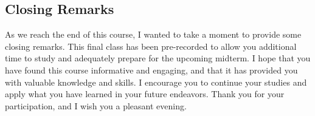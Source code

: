 \subsection{Closing Remarks}

As we reach the end of this course, I wanted to take a moment to provide
some closing remarks. This final class has been pre-recorded to allow
you additional time to study and adequately prepare for the upcoming
midterm. I hope that you have found this course informative and
engaging, and that it has provided you with valuable knowledge and
skills. I encourage you to continue your studies and apply what you have
learned in your future endeavors. Thank you for your participation, and
I wish you a pleasant evening.
